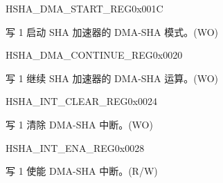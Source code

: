 \begin{register}{H}{SHA\_DMA\_START\_REG}{0x001C}\label{regdesc:SHADMASTARTREG}
%
%
\regnewline%
\begin{regdesc}\begin{reglist}
\label{fielddesc:SHADMASTART}\item [SHA\_DMA\_START] 写 1 启动 SHA 加速器的 DMA-SHA 模式。(WO)
\end{reglist}\end{regdesc}
\end{register}


\begin{register}{H}{SHA\_DMA\_CONTINUE\_REG}{0x0020}\label{regdesc:SHADMACONTINUEREG}
%
%
\regnewline%
\begin{regdesc}\begin{reglist}
\label{fielddesc:SHADMACONTINUE}\item [SHA\_DMA\_CONTINUE] 写 1 继续 SHA 加速器的 DMA-SHA 运算。(WO)
\end{reglist}\end{regdesc}
\end{register}


\begin{register}{H}{SHA\_INT\_CLEAR\_REG}{0x0024}\label{regdesc:SHAINTCLEARREG}
%
%
\regnewline%
\begin{regdesc}\begin{reglist}
\label{fielddesc:SHACLEARINTERRUPT}\item [SHA\_CLEAR\_INTERRUPT] 写 1 清除 DMA-SHA 中断。(WO)
\end{reglist}\end{regdesc}
\end{register}


\begin{register}{H}{SHA\_INT\_ENA\_REG}{0x0028}\label{regdesc:SHAINTENAREG}
%
%
\regnewline%
\begin{regdesc}\begin{reglist}
\label{fielddesc:SHAINTERRUPTENA}\item [SHA\_INTERRUPT\_ENA] 写 1 使能 DMA-SHA 中断。(R/W)
\end{reglist}\end{regdesc}
\end{register}


